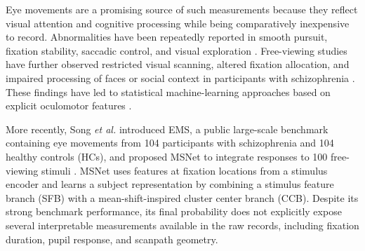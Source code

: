 \documentclass[conference,a4paper]{IEEEtran}
\begin{document}
Eye movements are a promising source of such measurements because they reflect visual attention and cognitive processing while being comparatively inexpensive to record. Abnormalities have been repeatedly reported in smooth pursuit, fixation stability, saccadic control, and visual exploration \cite{morita2020characteristics,wolf2021review}. Free-viewing studies have further observed restricted visual scanning, altered fixation allocation, and impaired processing of faces or social context in participants with schizophrenia \cite{bestelmeyer2006global,manor1999face,green2008visual}. These findings have led to statistical machine-learning approaches based on explicit oculomotor features \cite{benson2012simple,morita2017integrated,huang2020effective,kacur2020analysis}.

More recently, Song \emph{et al.} introduced EMS, a public large-scale benchmark containing eye movements from 104 participants with schizophrenia and 104 healthy controls (HCs), and proposed MSNet to integrate responses to 100 free-viewing stimuli \cite{song2024ems}. MSNet uses features at fixation locations from a stimulus encoder and learns a subject representation by combining a stimulus feature branch (SFB) with a mean-shift-inspired cluster center branch (CCB). Despite its strong benchmark performance, its final probability does not explicitly expose several interpretable measurements available in the raw records, including fixation duration, pupil response, and scanpath geometry.
\end{document}
